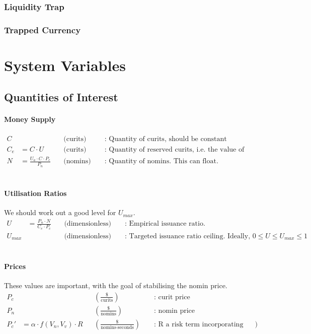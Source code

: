 \documentclass{article}
\begin{document}
\subsubsection{Liquidity Trap}
\subsubsection{Trapped Currency}

\section{System Variables}
\subsection{Quantities of Interest}
\paragraph{Money Supply}
\begin{align*}
    C & \ && \text{(curits)} && \text{ : Quantity of curits, should be constant} \\
    C_e &= C \cdot U \ && \text{(curits)} && \text{ : Quantity of reserved curits, i.e. the value of tokens have been issued against } \\
    N &= \frac{U_a \cdot C \cdot P_c}{P_n} \ && \text{(nomins)} && \text{ : Quantity of nomins. This can float.}
\end{align*}
\\

\paragraph{Utilisation Ratios} We should work out a good level for \(U_{max}\).
\begin{align*}
    U &= \frac{P_n \cdot N}{C_e \cdot P_c} \ && \text{(dimensionless)} && \text{ : Empirical issuance ratio. } \\
    U_{max} & \ && \text{(dimensionless)} && \text{ : Targeted issuance ratio ceiling. Ideally, } 0 \leq U \leq U_{max} \leq 1
\end{align*}
\\

\paragraph{Prices} These values are important, with the goal of stabilising the nomin price.
\begin{align*}
    P_c & \ && (\frac{\text{\$}}{\text{curits}}) && \text{ : curit price} \\
    P_n & \ && (\frac{\text{\$}}{\text{nomins}}) && \text{ : nomin price} \\
    P_c' &= \alpha \cdot f(V_n, V_v) \cdot R && (\frac{\text{\$}}{\text{nomins} \cdot \text{seconds}}) && \text{ : R a risk term incorporating volatility? \#buyers - \#sellers?})
\end{align*}
\\
\end{document}
